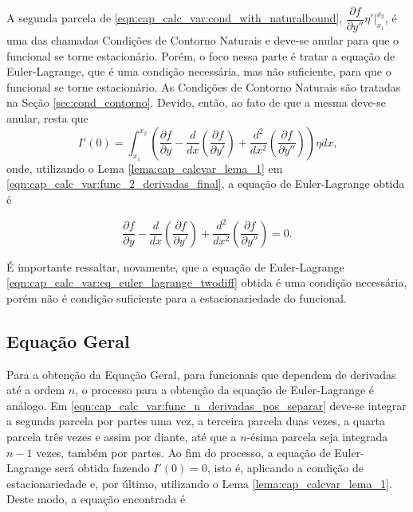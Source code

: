 \documentclass[
	12pt,				%
	openright,			%
    twoside,			%
	a4paper,			%
	english,			%
	french,				%
	spanish,			%
	brazil				%
	]{abntex2}
\numberwithin{lema}{chapter}
\numberwithin{teorema}{chapter}
\numberwithin{definicao}{chapter}
\numberwithin{exemplo}{chapter}
\numberwithin{figure}{chapter}
\begin{document}
A segunda parcela de \eqref{eqn:cap_calc_var:cond_with_naturalbound}, $\dfrac{\partial f}{\partial y''}\eta '\Big|_{x_1}^{x_2}$, é uma das chamadas Condições de Contorno Naturais e deve-se anular para que o funcional se torne estacionário. Porém, o foco nessa parte é tratar a equação de Euler-Lagrange, que é uma condição necessária, mas não suficiente, para que o funcional se torne estacionário. As Condições de Contorno Naturais são tratadas na Seção \ref{sec:cond_contorno}. Devido, então, ao fato de que a mesma deve-se anular, resta que
\begin{equation}
	\label{eqn:cap_calc_var:func_2_derivadas_final}
	I'(0)=
	\int_{x_1}^{x_2}
	\left (
		\frac{\partial f}{\partial y}
	-
		\frac{d}{dx}\left (
			\frac{\partial f}{\partial y'}
		\right )
	+
		\frac{d^2}{dx^2}\left (
			\frac{\partial f}{\partial y''}
		\right )
	\right ) \eta dx
	\text{,}
\end{equation}
onde, utilizando o Lema \ref{lema:cap_calcvar_lema_1} em \eqref{eqn:cap_calc_var:func_2_derivadas_final}, a equação de Euler-Lagrange obtida é

\begin{equation}
	\label{eqn:cap_calc_var:eq_euler_lagrange_twodiff}
	\frac{\partial f}{\partial y}
	-
	\frac{d}{dx}\left (
		\frac{\partial f}{\partial y'}
	\right )
	+
	\frac{d^2}{dx^2}\left (
		\frac{\partial f}{\partial y''}
	\right )
	=0 \text{.}
\end{equation}

É importante ressaltar, novamente, que a equação de Euler-Lagrange \eqref{eqn:cap_calc_var:eq_euler_lagrange_twodiff} obtida é uma condição necessária, porém não é condição suficiente para a estacionariedade do funcional.

\subsection{Equação Geral}

Para a obtenção da Equação Geral, para funcionais que dependem de derivadas até a ordem $n$, o processo para a obtenção da equação de Euler-Lagrange é análogo. Em \eqref{eqn:cap_calc_var:func_n_derivadas_pos_separar} deve-se integrar a segunda parcela por partes uma vez, a terceira parcela duas vezes, a quarta parcela três vezes e assim por diante, até que a $n$-ésima parcela seja integrada $n-1$ vezes, também por partes. Ao fim do processo, a equação de Euler-Lagrange será obtida fazendo $I'(0)=0$, isto é, aplicando a condição de estacionariedade e, por último, utilizando o Lema \ref{lema:cap_calcvar_lema_1}. Deste modo, a equação encontrada é
\end{document}
